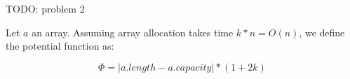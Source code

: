 TODO: problem 2

Let $a$ an array. Assuming array allocation takes time $k * n = O(n)$, we define the potential function as:

\begin{equation}\label{eq:phi}
\Phi = | a.length - a.capacity | * (1 + 2k)
\end{equation}
